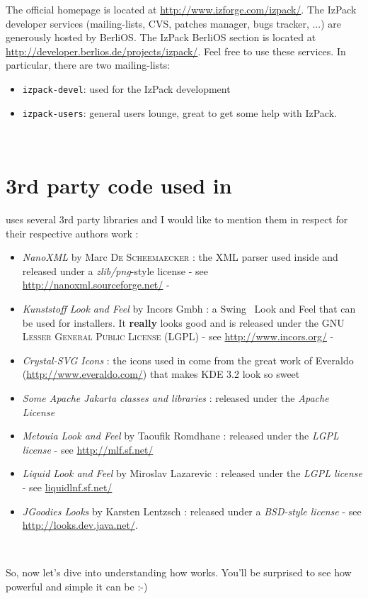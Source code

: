 The official \IzPack homepage is located at
\mbox{\url{http://www.izforge.com/izpack/}}. The IzPack developer services
(mailing-lists, CVS, patches manager, bugs tracker, ...) are generously hosted
by BerliOS. The IzPack BerliOS section is located at
\mbox{\url{http://developer.berlios.de/projects/izpack/}}. Feel free to
use these services. In particular, there are two mailing-lists:
\begin{itemize}
\item \texttt{izpack-devel}: used for the IzPack development
\item \texttt{izpack-users}: general users lounge, great to get some help with
IzPack.
\end{itemize}\

\section*{3rd party code used in \IzPack}

\IzPack uses several 3rd party libraries and I would like to mention them in
respect for their respective authors work :
\begin{itemize}
  \item \textit{NanoXML} by Marc \textsc{De Scheemaecker} : the XML parser used
  inside \IzPack and released under a \textit{zlib/png}-style license - see\\
  \url{http://nanoxml.sourceforge.net/} -
  \item \textit{Kunststoff Look and Feel} by Incors Gmbh : a Swing\texttrademark 
  \ Look and Feel
  that can be used for installers. It \textbf{really} looks good and
  is released under the \textsc{GNU Lesser General Public License (LGPL)} - see
  \url{http://www.incors.org/} -
  \item \textit{Crystal-SVG Icons} : the icons used in \IzPack come from
  the great work of Everaldo (\url{http://www.everaldo.com/}) that makes KDE 3.2
  look so sweet
  \item \textit{Some Apache Jakarta classes and libraries} : released under the
  \textit{Apache License}
  \item \textit{Metouia Look and Feel} by Taoufik Romdhane : released under the
  \textit{LGPL license} - see \url{http://mlf.sf.net/}
  \item \textit{Liquid Look and Feel} by Miroslav Lazarevic : released under the
  \textit{LGPL license} - see \url{liquidlnf.sf.net/}
  \item \textit{JGoodies Looks} by Karsten Lentzsch : released under a
  \textit{BSD-style license} - see \url{http://looks.dev.java.net/}.
\end{itemize}\

So, now let's dive into understanding how \IzPack works. You'll be
surprised to see how powerful and simple it can be :-)
